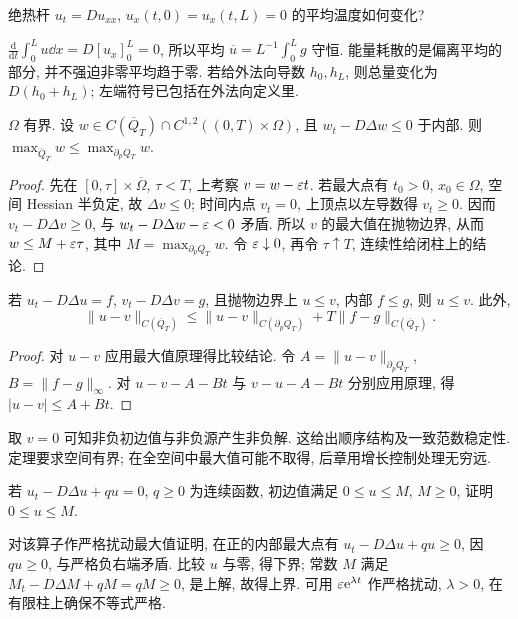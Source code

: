 \begin{example}
绝热杆 $u_t=Du_{xx}$, $u_x(t,0)=u_x(t,L)=0$ 的平均温度如何变化?
\end{example}
\begin{solution}
$\frac{\mathrm d}{\mathrm dt}\int_0^Lu\dd x=D[u_x]_0^L=0$, 所以平均 $\overline u=L^{-1}\int_0^Lg$ 守恒. 能量耗散的是偏离平均的部分, 并不强迫非零平均趋于零. 若给外法向导数 $h_0,h_L$, 则总量变化为 $D(h_0+h_L)$; 左端符号已包括在外法向定义里.
\end{solution}
\begin{theorem}\label{thm:heatmax}
$\Omega$ 有界. 设 $w\in C(\overline Q_T)\cap C^{1,2}((0,T)\times\Omega)$, 且 $w_t-D\Delta w\le0$ 于内部. 则 $\max_{\overline Q_T}w\le\max_{\partial_pQ_T}w$.
\end{theorem}
\begin{proof}
先在 $[0,\tau]\times\overline\Omega$, $\tau<T$, 上考察 $v=w-\varepsilon t$. 若最大点有 $t_0>0$, $x_0\in\Omega$, 空间 Hessian 半负定, 故 $\Delta v\le0$; 时间内点 $v_t=0$, 上顶点以左导数得 $v_t\ge0$. 因而 $v_t-D\Delta v\ge0$, 与 $w_t-D\Delta w-\varepsilon<0$ 矛盾. 所以 $v$ 的最大值在抛物边界, 从而 $w\le M+\varepsilon\tau$, 其中 $M=\max_{\partial_pQ_T}w$. 令 $\varepsilon\downarrow0$, 再令 $\tau\uparrow T$, 连续性给闭柱上的结论.
\end{proof}
\begin{corollary}\label{cor:heatcompare}
若 $u_t-D\Delta u=f$, $v_t-D\Delta v=g$, 且抛物边界上 $u\le v$, 内部 $f\le g$, 则 $u\le v$. 此外,
\[
\|u-v\|_{C(\overline Q_T)}\le\|u-v\|_{C(\partial_pQ_T)}+T\|f-g\|_{C(\overline Q_T)}.
\]
\end{corollary}
\begin{proof}
对 $u-v$ 应用最大值原理得比较结论. 令 $A=\|u-v\|_{\partial_pQ_T}$, $B=\|f-g\|_\infty$. 对 $u-v-A-Bt$ 与 $v-u-A-Bt$ 分别应用原理, 得 $|u-v|\le A+Bt$.
\end{proof}
取 $v=0$ 可知非负初边值与非负源产生非负解. 这给出顺序结构及一致范数稳定性. 定理要求空间有界; 在全空间中最大值可能不取得, 后章用增长控制处理无穷远.
\begin{exercise}
若 $u_t-D\Delta u+qu=0$, $q\ge0$ 为连续函数, 初边值满足 $0\le u\le M$, $M\ge0$, 证明 $0\le u\le M$.
\end{exercise}
\begin{solution}
对该算子作严格扰动最大值证明, 在正的内部最大点有 $u_t-D\Delta u+qu\ge0$, 因 $qu\ge0$, 与严格负右端矛盾. 比较 $u$ 与零, 得下界; 常数 $M$ 满足 $M_t-D\Delta M+qM=qM\ge0$, 是上解, 故得上界. 可用 $\varepsilon\mathrm e^{\lambda t}$ 作严格扰动, $\lambda>0$, 在有限柱上确保不等式严格.
\end{solution}
